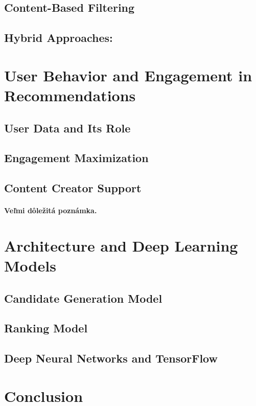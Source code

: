 \documentclass[12pt,english,a4paper]{article}
\begin{document}
\subsection{Content-Based Filtering} \label{core:cont-based}
\subsection{Hybrid Approaches:} \label{core:hybrid}

\section{User Behavior and Engagement in Recommendations} \label{behavior}
\subsection{User Data and Its Role} \label{behavior:userdata}
\subsection{Engagement Maximization} \label{behavior:engagement}
\subsection{Content Creator Support} \label{behavior:ccsuport}
\paragraph{Veľmi dôležitá poznámka.}
\section{Architecture and Deep Learning Models} \label{arch}
\subsection{Candidate Generation Model} \label{arch:cangen}
\subsection{Ranking Model} \label{arch:rank}
\subsection{Deep Neural Networks and TensorFlow} \label{arch:dnnt}
\section{Conclusion} \label{dolezitejsia}

\printbibliography
\end{document}

